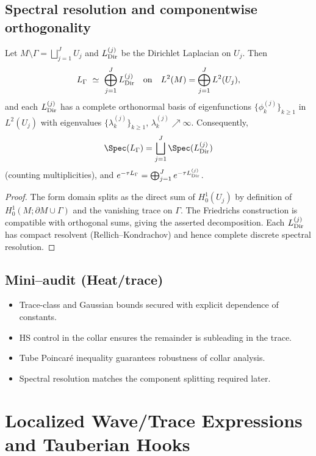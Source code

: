 \subsection{Spectral resolution and componentwise orthogonality}
\begin{theorem}
\label{thm:spectral-resolution}
Let $M\setminus\Gamma=\bigsqcup_{j=1}^J U_j$ and $L^{(j)}_{\rm Dir}$ be the Dirichlet Laplacian on $U_j$. Then
\[
L_\Gamma \ \simeq\ \bigoplus_{j=1}^J L^{(j)}_{\rm Dir}\quad\text{on}\quad
L^2(M)=\bigoplus_{j=1}^J L^2(U_j),
\]
and each $L^{(j)}_{\rm Dir}$ has a complete orthonormal basis of eigenfunctions $\{\phi^{(j)}_k\}_{k\ge1}$ in $L^2(U_j)$ with eigenvalues $\{\lambda^{(j)}_k\}_{k\ge1}$, $\lambda^{(j)}_k\nearrow\infty$. Consequently,
\[
\Spec(L_\Gamma)=\bigsqcup_{j=1}^J \Spec(L^{(j)}_{\rm Dir})
\]
(counting multiplicities), and $e^{-\tau L_\Gamma}=\bigoplus_{j=1}^J e^{-\tau L^{(j)}_{\rm Dir}}$.
\end{theorem}

\begin{proof}
The form domain splits as the direct sum of $H^1_0(U_j)$ by definition of $H^1_0(M;\partial M\cup\Gamma)$ and the vanishing trace on $\Gamma$. The Friedrichs construction is compatible with orthogonal sums, giving the asserted decomposition. Each $L^{(j)}_{\rm Dir}$ has compact resolvent (Rellich–Kondrachov) and hence complete discrete spectral resolution.
\end{proof}

\subsection*{Mini–audit (Heat/trace)}
\begin{itemize}
  \item Trace-class and Gaussian bounds secured with explicit dependence of constants.
  \item HS control in the collar ensures the remainder is subleading in the trace.
  \item Tube Poincaré inequality guarantees robustness of collar analysis.
  \item Spectral resolution matches the component splitting required later.
\end{itemize}

\section{Localized Wave/Trace Expressions and Tauberian Hooks}
\label{sec:localized-trace}

